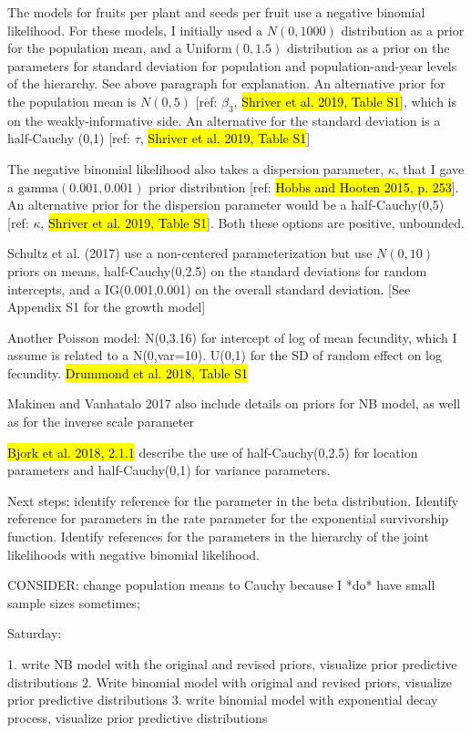 \documentclass[12pt, oneside, titlepage]{article}   	%
\begin{document}
The models for fruits per plant and seeds per fruit use a negative binomial likelihood. For these models, I initially used a $N(0,1000)$ distribution as a prior for the population mean, and a $\mathrm{Uniform}(0,1.5)$ distribution as a prior on the parameters for standard deviation for population and population-and-year levels of the hierarchy. See above paragraph for explanation. An alternative prior for the population mean is $N(0,5)$ [ref: $\beta_3$, \hl{Shriver et al. 2019, Table S1}], which is on the weakly-informative side. An alternative for the standard deviation is a half-Cauchy (0,1) [ref: $\tau$, \hl{Shriver et al. 2019, Table S1}]

 The negative binomial likelihood also takes a dispersion parameter, $\kappa$, that I gave a $\mathrm{gamma}(0.001,0.001)$ prior distribution [ref: \hl{Hobbs and Hooten 2015, p. 253}]. An alternative prior for the dispersion parameter would be a half-Cauchy(0,5) [ref: $\kappa$, \hl{Shriver et al. 2019, Table S1}]. Both these options are positive, unbounded. 

Schultz et al. (2017) use a non-centered parameterization but use $N(0,10)$ priors on means, half-Cauchy(0,2.5) on the standard deviations for random intercepts, and a IG(0.001,0.001) on the overall standard deviation. [See Appendix S1 for the growth model]

Another Poisson model: N(0,3.16) for intercept of log of mean fecundity, which I assume is related to a N(0,var=10). U(0,1) for the SD of random effect on log fecundity. \hl{Drummond et al. 2018, Table S1}

Makinen and Vanhatalo 2017 also include details on priors for NB model, as well as for the inverse scale parameter

\hl{Bjork et al. 2018, 2.1.1} describe the use of half-Cauchy(0,2.5) for location parameters and half-Cauchy(0,1) for variance parameters.

Next steps: identify reference for the parameter in the beta distribution. Identify reference for parameters in the rate parameter for the exponential survivorship function. Identify references for the parameters in the hierarchy of the joint likelihoods with negative binomial likelihood. 

CONSIDER: change population means to Cauchy because I *do* have small sample sizes sometimes; 

Saturday:

1. write NB model with the original and revised priors, visualize prior predictive distributions
2. Write binomial model with original and revised priors, visualize prior predictive distributions
3. write binomial model with exponential decay process, visualize prior predictive distributions
\end{document}
